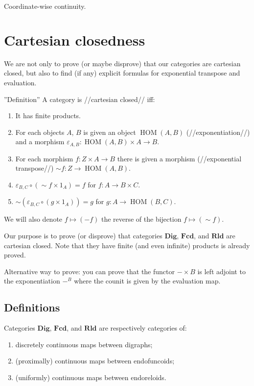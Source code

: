 Coordinate-wise continuity.

\section{Cartesian closedness}

We are not only to prove (or maybe disprove) that our categories are cartesian closed, but also to find (if any) explicit formulas for exponential transpose and evaluation.

''Definition'' A category is //cartesian closed// iff:
\begin{enumerate}
\item It has finite products.
\item For each objects $A$, $B$ is given an object $\operatorname{HOM} ( A , B)$ (//exponentiation//) and a morphism $\varepsilon_{A, B} : \operatorname{HOM} ( A , B) \times A \rightarrow B$.
\item For each morphism $f : Z \times A \rightarrow B$ there is given a morphism (//exponential transpose//) $\sim f : Z \rightarrow \operatorname{HOM} ( A , B)$.
\item $\varepsilon_{B,C} \circ ( \sim f \times 1_A) = f$ for $f : A \rightarrow B \times C$.
\item $\sim ( \varepsilon_{B,C} \circ ( g \times 1_A)) = g$ for $g : A \rightarrow \operatorname{HOM} ( B , C)$.
\end{enumerate}

We will also denote $f\mapsto (-f)$ the reverse of the bijection $f\mapsto (\sim f)$.

Our purpose is to prove (or disprove) that categories $\mathbf{Dig}$, $\mathbf{Fcd}$, and $\mathbf{Rld}$ are cartesian closed. Note that they have finite (and even infinite) products is already proved.

Alternative way to prove:
you can prove that the functor $-\times B$ is left adjoint to the exponentiation $-^B$ where the counit is given by the evaluation map.

\subsection{Definitions}

Categories $\mathbf{Dig}$, $\mathbf{Fcd}$, and $\mathbf{Rld}$ are respectively categories of:
\begin{enumerate}
\item discretely continuous maps between digraphs;
\item (proximally) continuous maps between endofuncoids;
\item (uniformly) continuous maps between endoreloids.
\end{enumerate}

